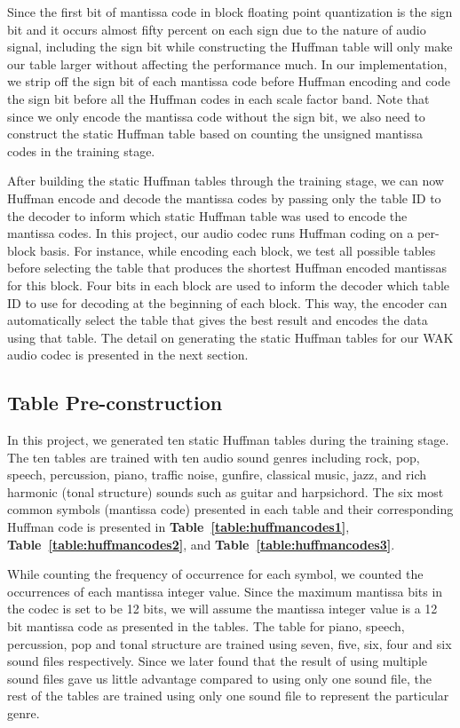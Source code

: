 \documentclass{vldb}
\begin{document}
Since the first bit of mantissa code in block floating point quantization is the sign bit and it occurs almost fifty percent on each sign due to the nature of audio signal, including the sign bit while constructing the Huffman table will only make our table larger without affecting the performance much. In our implementation, we strip off the sign bit of each mantissa code before Huffman encoding and code the sign bit before all the Huffman codes in each scale factor band. Note that since we only encode the mantissa code without the sign bit, we also need to construct the static Huffman table based on counting the unsigned mantissa codes in the training stage.   

After building the static Huffman tables through the training stage, we can now Huffman encode and decode the mantissa codes by passing only the table ID to the decoder to inform which static Huffman table was used to encode the mantissa codes. In this project, our audio codec runs Huffman coding on a per-block basis. For instance, while encoding each block, we test all possible tables before selecting the table that produces the shortest Huffman encoded mantissas for this block. Four bits in each block are used to inform the decoder which table ID to use for decoding at the beginning of each block. This way, the encoder can automatically select the table that gives the best result and encodes the data using that table. The detail on generating the static Huffman tables for our WAK audio codec is presented in the next section.

\subsection{Table Pre-construction}
In this project, we generated ten static Huffman tables during the training stage. The ten tables are trained with ten audio sound genres including rock, pop, speech, percussion, piano, traffic noise, gunfire, classical music, jazz, and rich harmonic (tonal structure) sounds such as guitar and harpsichord. The six most common symbols (mantissa code) presented in each table and their corresponding Huffman code is presented in \textbf{Table~\ref{table:huffmancodes1}}, \textbf{Table~\ref{table:huffmancodes2}}, and \textbf{Table~\ref{table:huffmancodes3}}.

While counting the frequency of occurrence for each symbol, we counted the occurrences of each mantissa integer value. Since the maximum mantissa bits in the codec is set to be 12 bits, we will assume the mantissa integer value is a 12 bit mantissa code as presented in the tables. The table for piano, speech, percussion, pop and tonal structure are trained using seven, five, six, four and six sound files respectively. Since we later found that the result of using multiple sound files gave us little advantage compared to using only one sound file, the rest of the tables are trained using only one sound file to represent the particular genre.
\end{document}
